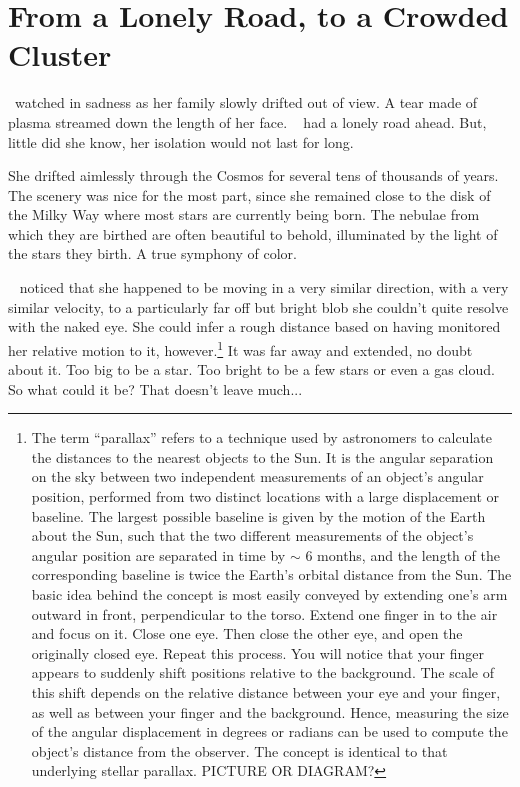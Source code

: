 \documentclass[main.tex]{subfiles}
\begin{document}
\chapter{From a Lonely Road, to a Crowded Cluster}

\par \nar \rmsterope~watched in sadness as her family slowly drifted out of view.  A tear made of plasma streamed down the length of her face.  \rmsterope~ had a lonely road ahead.  But, little did she know, her isolation would not last for long.

\par \nar She drifted aimlessly through the Cosmos for several tens of thousands of years.  The scenery was nice for the most part, since she remained close to the disk of the Milky Way where most stars are currently being born.  The nebulae from which they are birthed are often beautiful to behold, illuminated by the light of the stars they birth.  A true symphony of color.  

\par \nar \rmsterope~  noticed that she happened to be moving in a very similar direction, with a very similar velocity, to a particularly far off but bright blob she couldn't quite resolve with the naked eye.  She could infer a rough distance based on having monitored her relative motion to it, however.\footnote{The term ``parallax'' refers to a technique used by astronomers to calculate the distances to the nearest objects to the Sun.  It is the angular separation on the sky between two independent measurements of an object's angular position, performed from two distinct locations with a large displacement or baseline.  The largest possible baseline is given by the motion of the Earth about the Sun, such that the two different measurements of the object's angular position are separated in time by $\sim$ 6 months, and the length of the corresponding baseline is twice the Earth's orbital distance from the Sun.  The basic idea behind the concept is most easily conveyed by extending one's arm outward in front, perpendicular to the torso.  Extend one finger in to the air and focus on it.  Close one eye.  Then close the other eye, and open the originally closed eye.  Repeat this process.  You will notice that your finger appears to suddenly shift positions relative to the background.  The scale of this shift depends on the relative distance between your eye and your finger, as well as between your finger and the background.  Hence, measuring the size of the angular displacement in degrees or radians can be used to compute the object's distance from the observer.  The concept is identical to that underlying stellar parallax. PICTURE OR DIAGRAM?}  It was far away and extended, no doubt about it.  Too big to be a star.  Too bright to be a few stars or even a gas cloud.  So what could it be?  That doesn't leave much...
\end{document}
